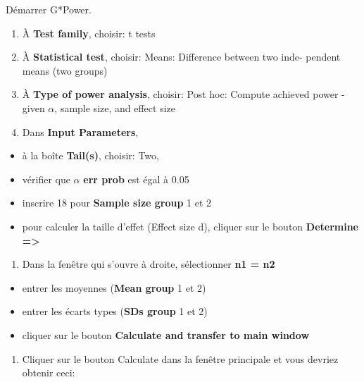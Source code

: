 \documentclass[
  12pt,
]{book}
\providecommand{\tightlist}{%
  \setlength{\itemsep}{0pt}\setlength{\parskip}{0pt}}
\begin{document}
Démarrer G*Power.

\begin{enumerate}
\def\labelenumi{\arabic{enumi}.}
\tightlist
\item
  À \textbf{Test family}, choisir: t tests
\item
  À \textbf{Statistical test}, choisir: Means: Difference between two inde- pendent means (two groups)
\item
  À \textbf{Type of power analysis}, choisir: Post hoc: Compute achieved power - given \(\alpha\), sample size, and effect size
\item
  Dans \textbf{Input Parameters},
\end{enumerate}

\begin{itemize}
\tightlist
\item
  à la boîte \textbf{Tail(s)}, choisir: Two,
\item
  vérifier que \(\alpha\) \textbf{err prob} est égal à 0.05
\item
  inscrire 18 pour \textbf{Sample size group} 1 et 2
\item
  pour calculer la taille d'effet (Effect size d), cliquer sur le bouton \textbf{Determine =\textgreater{}}
\end{itemize}

\begin{enumerate}
\def\labelenumi{\arabic{enumi}.}
\setcounter{enumi}{4}
\tightlist
\item
  Dans la fenêtre qui s'ouvre à droite, sélectionner \textbf{n1 = n2}
\end{enumerate}

\begin{itemize}
\tightlist
\item
  entrer les moyennes (\textbf{Mean group} 1 et 2)
\item
  entrer les écarts types (\textbf{SDs group} 1 et 2)
\item
  cliquer sur le bouton \textbf{Calculate and transfer to main window}
\end{itemize}

\begin{enumerate}
\def\labelenumi{\arabic{enumi}.}
\setcounter{enumi}{5}
\tightlist
\item
  Cliquer sur le bouton Calculate dans la fenêtre principale et vous devriez obtenir ceci:
\end{enumerate}
\end{document}
